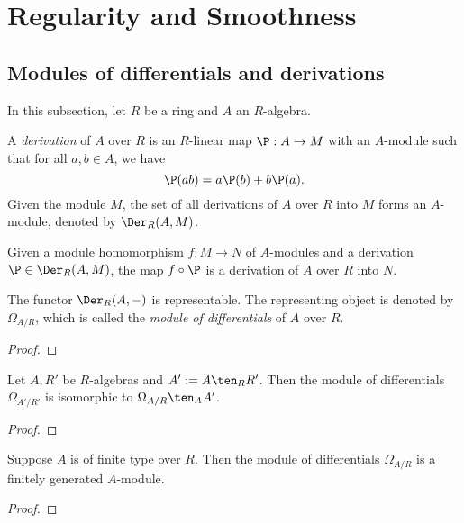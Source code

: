 \section{Regularity and Smoothness}

\subsection{Modules of differentials and derivations}

    In this subsection, let $R$ be a ring and $A$ an $R$-algebra.

    \begin{definition}[Derivation]\label{def: derivation}
        A \emph{derivation} of $A$ over $R$ is an $R$-linear map $\P: A \to M$ with an $A$-module such that for all $a, b \in A$, we have
        \[
            \P(ab) = a\P(b) + b\P(a).
        \]
        Given the module $M$, the set of all derivations of $A$ over $R$ into $M$ forms an \(A\)-module, denoted by $\Der_R(A, M)$.
    \end{definition}

    Given a module homomorphism \(f: M \to N\) of \(A\)-modules and a derivation \(\P \in \Der_R(A, M)\), the map $f \circ \P$ is a derivation of \(A\) over \(R\) into \(N\).

    \begin{proposition}\label{prop: module of differentials}
        The functor \(\Der_R(A, -)\) is representable.
        The representing object is denoted by \(\Omega_{A/R}\), which is called the \emph{module of differentials} of \(A\) over \(R\).
    \end{proposition}
    \begin{proof}
    \end{proof}

    \begin{proposition}\label{prop: module of differentials is stable under base change}
        Let \(A, R'\) be \(R\)-algebras and \(A':= A\ten_R R'\).
        Then the module of differentials \(\Omega_{A'/R'}\) is isomorphic to \(\Omega_{A/R} \ten_A A'\).
    \end{proposition}
    \begin{proof}
    \end{proof}

    \begin{proposition}\label{prop: module of differentials is finite}
        Suppose \(A\) is of finite type over \(R\).
        Then the module of differentials \(\Omega_{A/R}\) is a finitely generated \(A\)-module.
    \end{proposition}
    \begin{proof}
    \end{proof}

